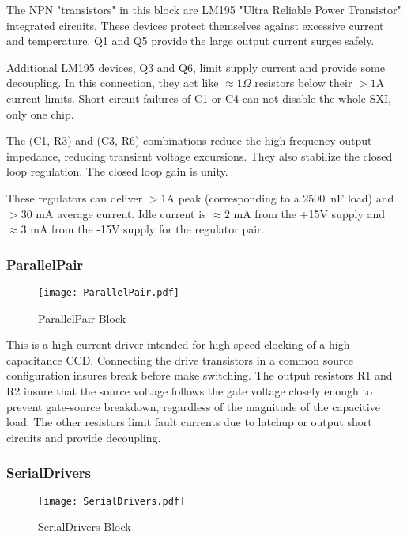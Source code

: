 The NPN "transistors" in this block are LM195 "Ultra Reliable Power Transistor" integrated circuits. These devices protect themselves against excessive current and temperature. Q1 and Q5 provide the large output current surges safely.

Additional LM195 devices, Q3 and Q6, limit supply current and provide some decoupling. In this connection, they act like $\approx 1\Omega$ resistors below their $>1$A current limits. Short circuit failures of C1 or C4 can not disable the whole SXI, only one chip.

The (C1, R3) and (C3, R6) combinations reduce the high frequency output impedance, reducing transient voltage excursions. They also stabilize the closed loop regulation. The closed loop gain is unity.

These regulators can deliver $>1$A peak (corresponding to a 2500\ nF load) and $>30$ mA average current. Idle current is  $\approx 2$ mA from the +15V supply and $\approx 3$ mA from the -15V supply for the regulator pair.

\subsubsection{ParallelPair}

   \begin{figure}
   \begin{center}
   \texttt{[image: ParallelPair.pdf]}
   \end{center}
   \caption{ParallelPair Block}
   \end{figure}

This is a high current driver intended for high speed clocking of a high capacitance CCD. Connecting the drive transistors in a common source configuration insures break before make switching. The output resistors R1 and R2 insure that the source voltage follows the gate voltage closely enough to prevent gate-source breakdown, regardless of the magnitude of the capacitive load. The other resistors limit fault currents due to latchup or output short circuits and provide decoupling.

\subsubsection{SerialDrivers}
   \begin{figure}
   \begin{center}
   \texttt{[image: SerialDrivers.pdf]}
   \end{center}
   \caption{SerialDrivers Block}
   \end{figure}
   
